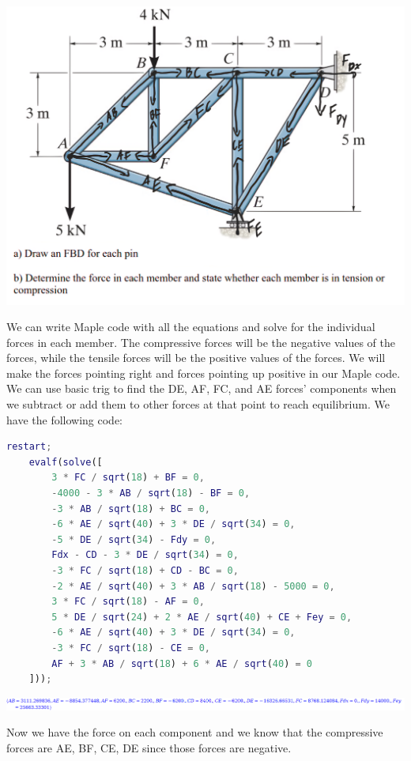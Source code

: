 \documentclass{article}[14pt, letterpaper, Times New Roman]
\begin{document}
\includegraphics[width=15cm]{l7-pbq.png}

We can write Maple code with all the equations and solve for the individual forces in each member.
The compressive forces will be the negative values of the forces, while the tensile forces will be the positive values of the forces.
We will make the forces pointing right and forces pointing up positive in our Maple code.
We can use basic trig to find the DE, AF, FC, and AE forces' components when we subtract or add them to other forces at that point to reach equilibrium.
We have the following code:

\begin{lstlisting}[language=matlab]
	restart; 
	evalf(solve([
		3 * FC / sqrt(18) + BF = 0, 
		-4000 - 3 * AB / sqrt(18) - BF = 0, 
		-3 * AB / sqrt(18) + BC = 0, 
		-6 * AE / sqrt(40) + 3 * DE / sqrt(34) = 0, 
		-5 * DE / sqrt(34) - Fdy = 0, 
		Fdx - CD - 3 * DE / sqrt(34) = 0, 
		-3 * FC / sqrt(18) + CD - BC = 0, 
		-2 * AE / sqrt(40) + 3 * AB / sqrt(18) - 5000 = 0, 
		3 * FC / sqrt(18) - AF = 0, 
		5 * DE / sqrt(24) + 2 * AE / sqrt(40) + CE + Fey = 0, 
		-6 * AE / sqrt(40) + 3 * DE / sqrt(34) = 0, 
		-3 * FC / sqrt(18) - CE = 0, 
		AF + 3 * AB / sqrt(18) + 6 * AE / sqrt(40) = 0
	]));
\end{lstlisting}

\includegraphics[width=15cm]{l7-pbq-o.png}

Now we have the force on each component and we know that the compressive forces are AE, BF, CE, DE since those forces are negative.
\end{document}
